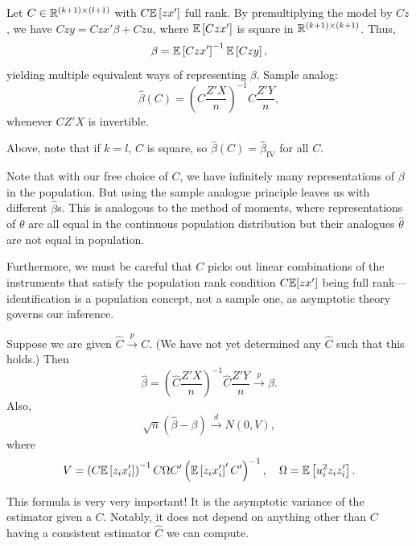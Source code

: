 \begin{definition}
	Let $C\in\mathbb{R}^{(k+1)\times(l+1)}$ with $C\mathbb{E}\left[zx'\right]$ full rank. By premultiplying the model by $Cz$, we have $Czy = Czx'\beta + Czu$, where $\mathbb{E}\left[Czx'\right] $ is square in $\mathbb{R}^{(k+1)\times (k+1)}$. Thus, \[
		\beta = \mathbb{E}\left[Czx'\right]^{-1}\mathbb{E}\left[Czy\right]
	,\]
	yielding multiple equivalent ways of representing $\beta$.
	Sample analog: \[
		\hat{\beta}(C) = \left(C\frac{Z'X}{n}\right)^{-1}C\frac{Z'Y}{n}
	,\]
	whenever $CZ'X$ is invertible.
\end{definition}

Above, note that if $k=l$, $C$ is square, so $\hat{\beta}(C) = \hat{\beta}_{\text{IV}}$ for all $C$.

Note that with our free choice of $C$, we have infinitely many representations of $\beta$ in the population. But using the sample analogue principle leaves us with different $\hat{\beta}$s. This is analogous to the method of moments, where representations of $\theta$ are all equal in the continuous population distribution but their analogues $\hat{\theta}$ are not equal in population.

Furthermore, we must be careful that $C$ picks out linear combinations of the instruments that satisfy the population rank condition $C\mathbb{E}[zx']$ being full rank---identification is a population concept, not a sample one, as asymptotic theory governs our inference.

\begin{proposition}
	Suppose we are given $\hat{C}\xrightarrow{p}C$. (We have not yet determined any $\hat{C}$ such that this holds.) Then \[
		\hat{\beta} = \left(\hat{C}\frac{Z'X}{n}\right)^{-1}\hat{C}\frac{Z'Y}{n} \xrightarrow{p} \beta
	.\]
	Also, \[
		\sqrt{n}(\hat{\beta}-\beta) \xrightarrow{d} N(0,V)
	,\]
	where \[
		V = \left(C\mathbb{E}\left[z_i x_i'\right]\right)^{-1}C\Omega C'\left(\mathbb{E}\left[z_i x_i'\right]'C'\right)^{-1}, \quad \Omega = \mathbb{E}\left[u_i^2 z_i z_i'\right]
	.\]
\end{proposition}

This formula is very very important! It is the asymptotic variance of the estimator given a $C$. Notably, it does not depend on anything other than $C$ having a consistent estimator $\hat{C}$ we can compute.

